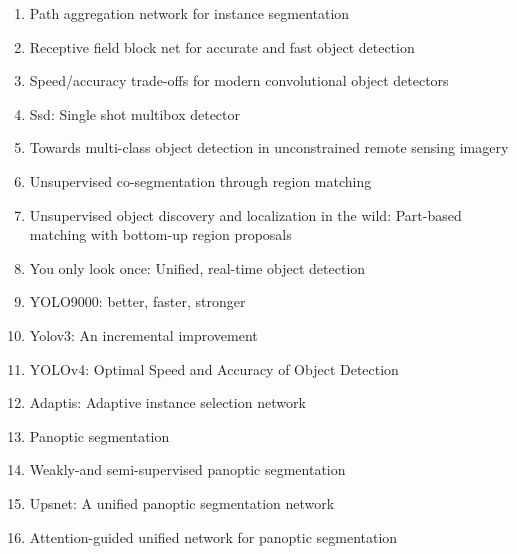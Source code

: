 \documentclass[acmlarge]{acmart}
\begin{document}
\begin{enumerate}
	\item Path aggregation network for instance segmentation \cite{liu2018path} 

	\item Receptive field block net for accurate and fast object detection \cite{liu2018receptive} 

	\item Speed/accuracy trade-offs for modern convolutional object detectors \cite{huang2017speed} 

	\item Ssd: Single shot multibox detector \cite{liu2016ssd} 

	\item Towards multi-class object detection in unconstrained remote sensing imagery \cite{azimi2018towards} 

	\item Unsupervised co-segmentation through region matching \cite{rubio2012unsupervised} 

	\item Unsupervised object discovery and localization in the wild: Part-based matching with bottom-up region proposals \cite{cho2015unsupervised} 

	\item You only look once: Unified, real-time object detection \cite{redmon2016you} 

	\item YOLO9000: better, faster, stronger \cite{redmon2017yolo9000} 

	\item Yolov3: An incremental improvement \cite{redmon2018yolov3} 

	\item YOLOv4: Optimal Speed and Accuracy of Object Detection \cite{bochkovskiy2020yolov4} 

	\item Adaptis: Adaptive instance selection network \cite{sofiiuk2019adaptis} 

	\item Panoptic segmentation \cite{kirillov2019panoptic} 

	\item Weakly-and semi-supervised panoptic segmentation \cite{li2018weakly} 

	\item Upsnet: A unified panoptic segmentation network \cite{xiong2019upsnet} 

	\item Attention-guided unified network for panoptic segmentation \cite{li2019attention} 


\end{enumerate}
\end{document}
